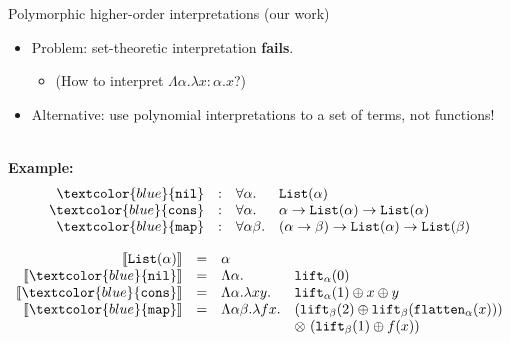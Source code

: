 \documentclass[10pt,presentation,color=names]{beamer}
\newcommand{\arrtype}{\rightarrow}
\newcommand{\flatten}{\mathtt{flatten}}
\newcommand{\lift}{\mathtt{lift}}
\newcommand{\typeinterpret}[1]{\llbracket #1 \rrbracket}
\newcommand{\interpret}[1]{\llbracket #1 \rrbracket}
\newcommand{\symb}[1]{\textcolor{blue}{\mathtt{#1}}}
\newcommand{\List}{\mathtt{List}}
\newcommand{\nil}{\symb{nil}}
\newcommand{\cons}{\symb{cons}}
\newcommand{\map}{\symb{map}}
\begin{document}
\begin{frame}{Polymorphic higher-order interpretations (our work)}

\begin{itemize}
\item Problem: set-theoretic interpretation \alert{\textbf{fails}}.
  \begin{itemize}
  \item[] (How to interpret $\Lambda \alpha.\lambda x:\alpha.x$?)
  \end{itemize}
\item\pause Alternative: use polynomial interpretations to a set of \alert{terms}, not \alert{functions}!
\end{itemize}

\ \\\pause\textbf{Example:}
\[
\begin{array}{rcll}
\nil & : & \forall \alpha. & \List(\alpha) \\
\cons & : & \forall \alpha. & \alpha \arrtype \List(\alpha) \arrtype \List(\alpha) \\
\map & : & \forall \alpha \beta. & (\alpha \arrtype \beta) \arrtype \List(\alpha) \arrtype \List(\beta) \\
\end{array}
\]

\[
\begin{array}{rcll}
\typeinterpret{\List(\alpha)} & = & \alpha \\
\interpret{\nil} & = & \Lambda \alpha. & \lift_\alpha(0) \\
\interpret{\cons} & = & \Lambda \alpha.\lambda xy. & \lift_\alpha(1) \oplus x \oplus y \\
\interpret{\map} & = & \Lambda \alpha\beta.\lambda f x. & (\lift_\beta(2) \oplus \lift_\beta(\flatten_\alpha(x))) \\
  & & & \otimes\ (\lift_\beta(1) \oplus f(x)) \\
\end{array}
\]
\end{frame}

\end{document}
